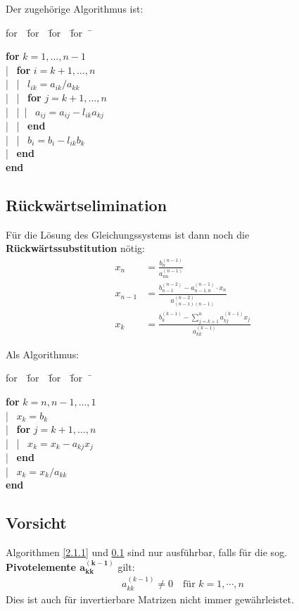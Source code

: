 \documentclass[ngerman,fontsize=11pt, paper=a4, parskip=half, titlepage=true, toc=bib]{scrbook}
\newenvironment{pseudocode}[1]{ %
		\begin{minipage}{#1}
			\begin{framed}
				\hspace*{1em}	
				\begin{minipage}{#1}
					\begin{tabbing}
						for~~\= for~~\= for~~\= for~~\= \kill
	}
	{ %
					\end{tabbing}
				\end{minipage}
				\hspace*{1em}
			\end{framed}
		\end{minipage}
	}
\begin{document}
Der zugehörige Algorithmus ist:

\begin{pseudocode}{0.5\linewidth}
	\textbf{for} $ k = 1, \dots , n-1$\\
	|~	\> \textbf{for} $i = k + 1, \dots , n$ \\
	|~	\> |~\> $l_{ik} = a_{ik} /a_{kk}$\\
	|~	\> |~\> \textbf{for} $j = k + 1, \dots , n$ \\
	|~	\> |~\>|~\> $a_{ij} = a_{ij} - l_{ik} a_{kj} $\\
	|~	\> |~\> \textbf{end}\\
	|~	\> |~\> $b_i = b_i -  l_{ik} b_k $\\
	|~	\> \textbf{end} \\
\textbf{end}
\end{pseudocode}

\subsection{Rückwärtselimination}\label{2.1.2}
Für die Lösung des Gleichungssystems ist dann noch die \textbf{Rückwärtssubstitution}  nötig:
\begin{align}
	x_n &= \frac{b_n^{(n-1)}}{a_{nn}^{(n-1)}} \label{II.1.5} \\
	x_{n-1} &=  \frac{b_{n-1}^{(n-2)}-a_{n-1,n}^{(n-1)}\cdot x_n}{a_{(n-1)(n-1)}^{(n-2)}} \label{II.1.6} \\
	x_k &= \frac{b_k^{(k-1)}-\sum_{j=k+1}^{n}a_{kj}^{(k-1)}x_j}{a_{kk}^{(k-1)}} \label{II.1.7}
\end{align}

Als Algorithmus:

\begin{pseudocode}{0.5\linewidth}
	\textbf{for} $k = n, n -1, \dots , 1$ \\
	|~		\>$x_k = b_k$ \\
	|~		\>\textbf{for} $j = k + 1, \dots , n$ \\
	|~		\>|~	$x_k = x_k - a_{kj}x_j$ \\
	|~		\>\textbf{end} \\
	|~		\>$x_k = x_k /a_{kk}$ \\
	\textbf{end}
\end{pseudocode}

\subsection{Vorsicht}
	Algorithmen \ref{2.1.1} und \ref{2.1.2} sind nur ausführbar, falls für die sog. \textbf{Pivotelemente $\mathbf{a_{kk}^{(k-1)}}$ }  gilt:
	\begin{gather*}
			a_{kk}^{(k-1)} \neq 0 \quad   \text{für } k=1, \cdots , n
	\end{gather*}
	Dies ist auch für invertierbare Matrizen nicht immer gewährleistet.
	
\end{document}
